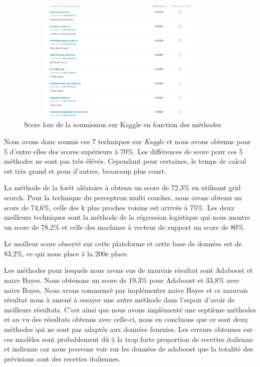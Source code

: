 \documentclass[12pt]{article}
\begin{document}
\begin{figure}[h]
	\begin{center}
	\includegraphics[width=10cm,height=6cm]{./soumission_kaggle.png}
	\end{center}
	\caption{Score lors de la soumission sur Kaggle en fonction des méthodes}
	\label{label-soumission}
\end{figure}

Nous avons donc soumis ces 7 techniques sur \textit{Kaggle} et nous avons obtenus pour 5 d'entre elles des scores supérieurs à 70\%. Les différences de score pour ces 5 méthodes ne sont pas très élévés. Cependant pour certaines, le temps de calcul est très grand et pour d'autres, beaucoup plus court.

La méthode de la forêt aléatoire à obtenu un score de 72,3\% en utilisant grid search. Pour la technique du perceptron multi couches, nous avons obtenu un score de 74,6\%, celle des k plus proches voisins est arrivée à 75\%. Les deux meilleurs techniques sont la méthode de la régression logistique qui nous montre un score de 78,2\% et celle des machines à vecteur de support un score de 80\%.

Le meilleur score observé sur cette plateforme et cette base de données est de 83,2\%, ce qui nous place à la 200e place.

Les méthodes pour lesquels nous avons eus de mauvais résultat sont Adaboost et naive Bayes. Nous obtenons un score de 19,3\% pour Adaboost et 33,8\% avec naive Bayes. Nous avons commencé par implémenter naive Bayes et ce mauvais résultat nous à amené à essayer une autre méthode dans l'espoir d'avoir de meilleurs résultats. C'est ainsi que nous avons implémenté une septième méthodes et au vu des résultats obtenus avec celle-ci, nous en concluons que ce sont deux méthodes qui ne sont pas adaptés aux données fournies. Les erreurs obtenues sur ces modèles sont probablement dû à la trop forte proportion de recettes italienne et indienne car nous pouvons voir sur les données de adaboost que la totalité des prévisions sont des recettes italiennes.
\end{document}
